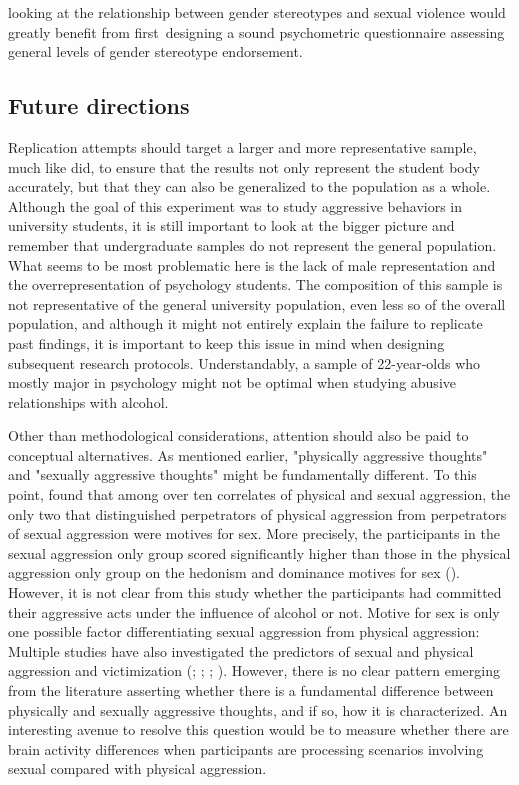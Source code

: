 \documentclass[serif, authordate, twocolumn, empirical]{jote-article}
\begin{document}
looking at the relationship between gender stereotypes and sexual violence would greatly benefit from first\ designing a sound psychometric questionnaire assessing general levels of gender stereotype endorsement.  

{}
\subsection*{Future directions }
Replication attempts should target a larger and more representative sample, much like \textcite{SubraMullerBegueLBushmanDelmas2010} did, to ensure that the results not only represent the student body accurately, but that they can also be generalized to the population as a whole. Although the goal of this experiment was to study aggressive behaviors in university students, it is still important to look at the bigger picture and remember that undergraduate samples do not represent the general population. What seems to be most problematic here is the lack of male representation and the overrepresentation of psychology students. The composition of this sample is not representative of the general university population, even less so of the overall population, and although it might not entirely explain the failure to replicate past findings, it is important to keep this issue in mind when designing subsequent research protocols. Understandably, a sample of 22-year-olds who mostly major in psychology might not be optimal when studying abusive relationships with alcohol. 

Other than methodological considerations, attention should also be paid to conceptual alternatives. As mentioned earlier, "physically aggressive thoughts" and "sexually aggressive thoughts" might be fundamentally different. To this point, \textcite{WhiteMcMullinSwartoutSechristGollehon2008} found that among over ten correlates of physical and sexual aggression, the only two that distinguished perpetrators of physical aggression from perpetrators of sexual aggression were motives for sex. More precisely, the participants in the sexual aggression only group scored significantly higher than those in the physical aggression only group on the hedonism and dominance motives for sex (\cite{WhiteMcMullinSwartoutSechristGollehon2008}). However, it is not clear from this study whether the participants had committed their aggressive acts under the influence of alcohol or not. Motive for sex is only one possible factor differentiating sexual aggression from physical aggression: Multiple studies have also investigated the predictors of sexual and physical aggression and victimization (;  \cite{GidyczWarkentinOrchowski2007};  ; \cite{ZawackiAbbeyBuckMcAuslanClintonSherrodA2003}). However, there is no clear pattern emerging from the literature asserting whether there is a fundamental difference between physically and sexually aggressive thoughts, and if so, how it is characterized. An interesting avenue to resolve this question would be to measure whether there are brain activity differences when participants are processing scenarios involving sexual compared with physical aggression. 
\end{document}
